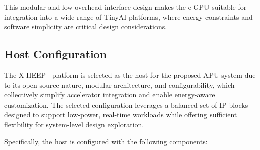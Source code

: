             This modular and low-overhead interface design makes the \mbox{e-GPU} suitable for integration into a wide range of TinyAI platforms, where energy constraints and software simplicity are critical design considerations.

        \subsection{Host Configuration}
        
            The \mbox{X-HEEP}~\cite{x-heep} platform is selected as the host for the proposed APU system due to its open-source nature, modular architecture, and configurability, which collectively simplify accelerator integration and enable energy-aware customization. The selected configuration leverages a balanced set of IP blocks designed to support low-power, real-time workloads while offering sufficient flexibility for system-level design exploration.
        
            Specifically, the host is configured with the following components:


